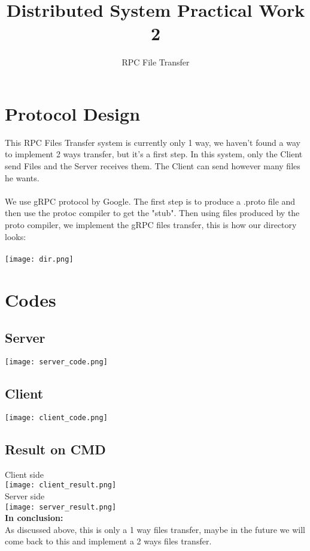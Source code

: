 \documentclass[12pt]{article}
\title{Distributed System Practical Work 2}
\author{RPC File Transfer}
\begin{document}
\maketitle

\tableofcontents
\pagebreak

\section{Protocol Design}
This RPC Files Transfer system is currently only 1 way, we haven't found a way to implement 2 ways transfer, but it's a first step. In this system, only the Client send Files and the Server receives them. The Client can send however many files he wants.\\ \\
We use gRPC protocol by Google. The first step is to produce a .proto file and then use the protoc compiler to get the "stub". Then using files produced by the proto compiler, we implement the gRPC files transfer, this is how our directory looks:\\ \\
\texttt{[image: dir.png]}

\section{Codes}
\subsection{Server}
\texttt{[image: server\_code.png]}

\subsection{Client}
\texttt{[image: client\_code.png]}

\subsection{Result on CMD}
Client side\\
\texttt{[image: client\_result.png]}\\
Server side\\
\texttt{[image: server\_result.png]}\\


\textbf{In conclusion:}\\
As discussed above, this is only a 1 way files transfer, maybe in the future we will come back to this and implement a 2 ways files transfer.
\end{document}
